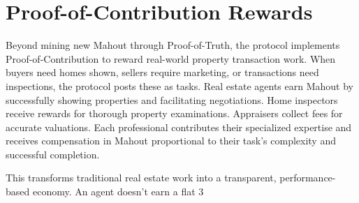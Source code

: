 \section{Proof-of-Contribution Rewards}

Beyond mining new Mahout through Proof-of-Truth, the protocol implements Proof-of-Contribution to reward real-world property transaction work. When buyers need homes shown, sellers require marketing, or transactions need inspections, the protocol posts these as tasks. Real estate agents earn Mahout by successfully showing properties and facilitating negotiations. Home inspectors receive rewards for thorough property examinations. Appraisers collect fees for accurate valuations. Each professional contributes their specialized expertise and receives compensation in Mahout proportional to their task's complexity and successful completion.

This transforms traditional real estate work into a transparent, performance-based economy. An agent doesn't earn a flat 3%

